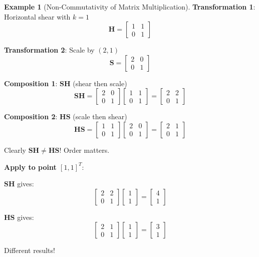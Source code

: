 \documentclass[12pt,a4paper]{article}
\theoremstyle{definition}
\newtheorem{example}{Example}[section]
\begin{document}
\begin{example}[Non-Commutativity of Matrix Multiplication]
\textbf{Transformation 1}: Horizontal shear with $k=1$
\[
\mathbf{H} = \begin{bmatrix}
1 & 1 \\
0 & 1
\end{bmatrix}
\]

\textbf{Transformation 2}: Scale by $(2, 1)$
\[
\mathbf{S} = \begin{bmatrix}
2 & 0 \\
0 & 1
\end{bmatrix}
\]

\textbf{Composition 1}: $\mathbf{S}\mathbf{H}$ (shear then scale)
\[
\mathbf{S}\mathbf{H} = \begin{bmatrix}
2 & 0 \\
0 & 1
\end{bmatrix}
\begin{bmatrix}
1 & 1 \\
0 & 1
\end{bmatrix}
= \begin{bmatrix}
2 & 2 \\
0 & 1
\end{bmatrix}
\]

\textbf{Composition 2}: $\mathbf{H}\mathbf{S}$ (scale then shear)
\[
\mathbf{H}\mathbf{S} = \begin{bmatrix}
1 & 1 \\
0 & 1
\end{bmatrix}
\begin{bmatrix}
2 & 0 \\
0 & 1
\end{bmatrix}
= \begin{bmatrix}
2 & 1 \\
0 & 1
\end{bmatrix}
\]

Clearly $\mathbf{S}\mathbf{H} \neq \mathbf{H}\mathbf{S}$! Order matters.

\textbf{Apply to point $[1, 1]^T$}:

$\mathbf{S}\mathbf{H}$ gives:
\[
\begin{bmatrix}
2 & 2 \\
0 & 1
\end{bmatrix}
\begin{bmatrix}
1 \\ 1
\end{bmatrix}
= \begin{bmatrix}
4 \\ 1
\end{bmatrix}
\]

$\mathbf{H}\mathbf{S}$ gives:
\[
\begin{bmatrix}
2 & 1 \\
0 & 1
\end{bmatrix}
\begin{bmatrix}
1 \\ 1
\end{bmatrix}
= \begin{bmatrix}
3 \\ 1
\end{bmatrix}
\]

Different results!
\end{example}
\end{document}
